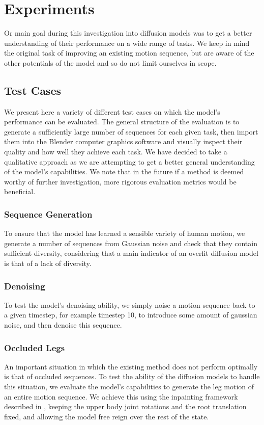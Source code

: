 \section{Experiments}
\label{sec:diffusion_experiments}

Or main goal during this investigation into diffusion models was to get a better understanding of their performance on a wide range of tasks. We keep in mind the original task of improving an existing motion sequence, but are aware of the other potentials of the model and so do not limit ourselves in scope.


\subsection{Test Cases}
We present here a variety of different test cases on which the model's performance can be evaluated. The general structure of the evaluation is to generate a sufficiently large number of sequences for each given task, then import them into the Blender computer graphics software and visually inspect their quality and how well they achieve each task. We have decided to take a qualitative approach as we are attempting to get a better general understanding of the model's capabilities. We note that in the future if a method is deemed worthy of further investigation, more rigorous evaluation metrics would be beneficial.

\subsubsection{Sequence Generation}
To ensure that the model has learned a sensible variety of human motion, we generate a number of sequences from Gaussian noise and check that they contain sufficient diversity, considering that a main indicator of an overfit diffusion model is that of a lack of diversity.

\subsubsection{Denoising}
To test the model's denoising ability, we simply noise a motion sequence back to a given timestep, for example timestep 10, to introduce some amount of gaussian noise, and then denoise this sequence.

\subsubsection{Occluded Legs}
An important situation in which the existing method does not perform optimally is that of occluded sequences. To test the ability of the diffusion models to handle this situation, we evaluate the model's capabilities to generate the leg motion of an entire motion sequence. We achieve this using the inpainting framework described in , keeping the upper body joint rotations and the root translation fixed, and allowing the model free reign over the rest of the state.

